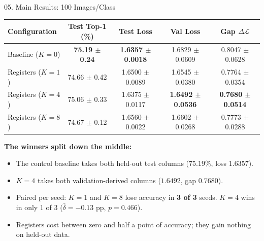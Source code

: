 \documentclass[aspectratio=169]{beamer}
\begin{document}
\begin{frame}{05. Main Results: 100 Images/Class}
\small
\begin{center}
\scriptsize
\setlength{\tabcolsep}{5pt}
\begin{tabular}{lcccc}
\toprule
\textbf{Configuration} & \textbf{Test Top-1 (\%)} & \textbf{Test Loss} & \textbf{Val Loss} & \textbf{Gap $\Delta\mathcal{L}$} \\
\midrule
Baseline ($K=0$)  & \textbf{75.19 $\pm$ 0.24} & \textbf{1.6357 $\pm$ 0.0018} & 1.6829 $\pm$ 0.0609 & 0.8047 $\pm$ 0.0628 \\
Registers ($K=1$) & 74.66 $\pm$ 0.42 & 1.6500 $\pm$ 0.0089 & 1.6545 $\pm$ 0.0380 & 0.7764 $\pm$ 0.0354 \\
Registers ($K=4$) & 75.06 $\pm$ 0.33 & 1.6375 $\pm$ 0.0117 & \textbf{1.6492 $\pm$ 0.0536} & \textbf{0.7680 $\pm$ 0.0514} \\
Registers ($K=8$) & 74.67 $\pm$ 0.12 & 1.6560 $\pm$ 0.0022 & 1.6602 $\pm$ 0.0268 & 0.7773 $\pm$ 0.0288 \\
\bottomrule
\end{tabular}
\end{center}

\smallskip
\textbf{The winners split down the middle:}
\begin{itemize}\itemsep=1.5pt
\item The control baseline takes both held-out test columns ($75.19\%$, loss $1.6357$).
\item $K=4$ takes both validation-derived columns ($1.6492$, gap $0.7680$).
\item Paired per seed: $K=1$ and $K=8$ lose accuracy in \textbf{3 of 3} seeds. $K=4$ wins in only 1 of 3 ($\bar{\delta} = -0.13$ pp, $p = 0.466$).
\item Registers cost between zero and half a point of accuracy; they gain nothing on held-out data.
\end{itemize}
\end{frame}
\end{document}
